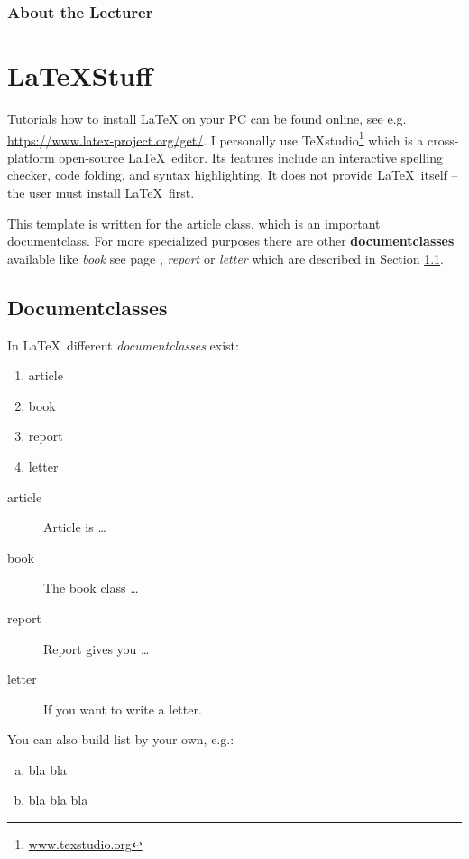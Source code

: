 \documentclass{article}
\begin{document}
\subsubsection*{About the Lecturer}



\section{\LaTeX Stuff}

Tutorials how to install \LaTeX{} on your PC can be found online, see e.g. \url{https://www.latex-project.org/get/}. I personally use TeXstudio\footnote{\url{www.texstudio.org}}  which is a cross-platform open-source \LaTeX\ editor. Its features include an interactive spelling checker, code folding, and syntax highlighting. It does not provide \LaTeX\ itself -- the user must install \LaTeX\ first.

This template is written for the article class, which is an important documentclass. For more specialized purposes there are other \textbf{documentclasses} available like \textit{book} see page \pageref{book}, \textit{report} or \textit{letter} which are 
	described in Section \ref{documentclasses}. 
	
\subsection{Documentclasses}\label{documentclasses}
In \LaTeX\ different \textit{documentclasses} exist:	
	\begin{enumerate}
		\item article
		\item book 
		\item report 
		\item letter 
	\end{enumerate}
	
	\begin{description}
		\item[article\label{article}]{Article is \ldots}
		\item[book\label{book}]{The book class \ldots}
		\item[report\label{report}]{Report gives you \ldots}
		\item[letter\label{letter}]{If you want to write a letter.}
	\end{description}

You can also build list by your own, e.g.:
\begin{enumerate}[a)]
	\item bla bla
	\item bla bla bla
\end{enumerate}
\end{document}
